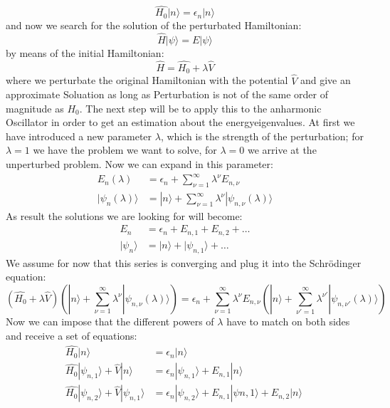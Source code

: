 \begin{equation}
\hat{H_0} |n\rangle = \epsilon_n |n\rangle 
\end{equation}
and now we search for the solution of the perturbated Hamiltonian:
\begin{equation}
    \hat{H}|\psi \rangle = E|\psi \rangle 
\end{equation}
by means of the initial Hamiltonian:
\begin{equation}
    \hat{H} = \hat{H_0} + \lambda \hat{V}
\end{equation}
where we perturbate the original Hamiltonian with the potential
$\hat{V}$ and give an approximate Soluation as long as Perturbation
is not of the same order of magnitude as $H_0$. 
The next step will be to apply this to the anharmonic 
Oscillator in order to get an estimation about the energyeigenvalues.
At first we have introduced a new parameter $\lambda$, which is the 
strength of the perturbation; for $\lambda = 1$ we have the problem
we want to solve, for $\lambda = 0 $ we arrive at the unperturbed
problem. Now we can expand in this parameter:
\begin{align}
    E_n(\lambda) &= \epsilon_n + \sum_{\nu =1}^{\infty} \lambda^\nu
    E_{n,\nu} \\ 
    |\psi_n(\lambda)\rangle &=
    |n\rangle + \sum_{\nu =1}^{\infty} \lambda^\nu
    |\psi_{n,\nu}(\lambda)\rangle
\end{align}
As result the solutions we are looking for will become:
\begin{align}
    E_n &= \epsilon_n + E_{n,1} + E_{n,2} + \ldots\\ 
    |\psi_n \rangle &= |n\rangle + |\psi_{n,1} \rangle + \ldots 
\end{align}
We assume for now that this series is converging and plug it into
the Schrödinger equation:
\begin{equation}
    (\hat{H_0} + \lambda \hat{V})
   \left( |n\rangle + \sum_{\nu =1}^{\infty} \lambda^\nu
        |\psi_{n,\nu}(\lambda)\rangle \right) =
\epsilon_n + \sum_{\nu =1}^{\infty} \lambda^\nu
    E_{n,\nu}  
    \left( |n\rangle + \sum_{\nu' =1}^{\infty} \lambda^{\nu'}
        |\psi_{n,\nu'}(\lambda)\rangle \right) 
\end{equation}
Now we can impose that the different powers of $\lambda$ have to
match on both sides and receive a set of equations:
\begin{align}
    \hat{H_0} |n\rangle &= \epsilon_n |n\rangle\\
    \hat{H_0} |\psi_{n,1}\rangle + \hat{V}|n\rangle &=
    \epsilon_n |\psi_{n,1}\rangle + E_{n,1}|n\rangle \label{eq:dev1}\\
    \hat{H_0} |\psi_{n,2}\rangle + \hat{V}|\psi_{n,1}\rangle &=
    \epsilon_n |\psi_{n,2}\rangle + E_{n,1}|\psi{n,1}\rangle 
    + E_{n,2}|n\rangle \label{eq:dev2}\
\end{align}
